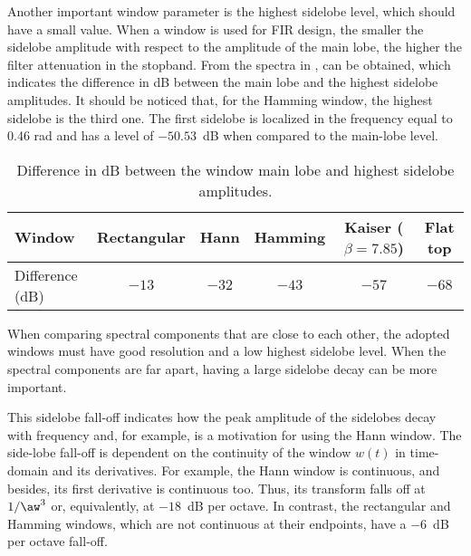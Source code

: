 Another important window parameter is the highest sidelobe level, which should have a small value.
When a window is used for FIR design, the smaller the sidelobe amplitude with respect to the amplitude of the main lobe, the higher the filter attenuation in the stopband.
From the spectra in ,  can be obtained, which indicates the difference in dB between the main lobe and the highest sidelobe amplitudes.
It should be noticed that, for the Hamming window, the highest sidelobe is the third one. The first sidelobe is localized in the frequency equal to 0.46 rad and has a level of $-50.53$~dB when compared to the main-lobe level. 

\begin{table}
\centering
\caption{Difference in dB between the window main lobe and highest sidelobe amplitudes.\label{tab:windows_sidelobe}}
\begin{tabular}{|l|c|c|c|c|c|}
\hline
Window &	Rectangular	& Hann	& Hamming	& Kaiser ($\beta=7.85$)& Flat top \\ \hline
Difference (dB) &	$-13$	& $-32$	& $-43$ &	$-57$&  $-68$ \\ \hline
\end{tabular}
\end{table}

When comparing spectral components that are close to each other, the adopted windows must have good resolution and a low highest sidelobe level. When the spectral components are far apart, having a large sidelobe decay can be more important.
	
This sidelobe fall-off indicates how the peak amplitude of the sidelobes decay with frequency and, for example, is a motivation for using the Hann window.
The side-lobe fall-off is dependent on the continuity of the window $w(t)$ in time-domain and its derivatives. For example, the Hann window is continuous, and besides, its first derivative is continuous too. Thus, its transform falls off at $1/\aw^3$ or, equivalently, at $-18$~dB per octave. In contrast, the rectangular and Hamming windows, which are not continuous at their endpoints, have a $-6$~dB per octave fall-off.



